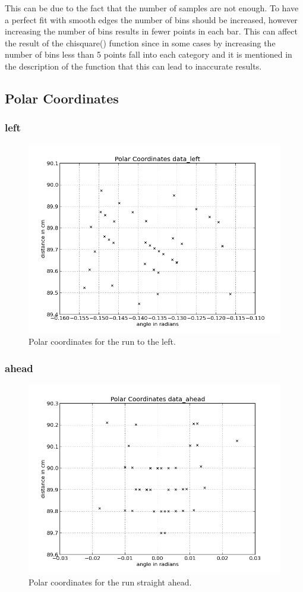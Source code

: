 \documentclass{scrartcl}
\begin{document}
This can be due to the fact that the number of samples are not enough. To have a perfect fit with smooth edges the number of bins should be increased, however increasing the number of bins results in fewer points in each bar. This can affect the result of the chisquare() function since in some cases by increasing the number of bins less than 5 points fall into each category and it is mentioned in the description of the function that this can lead to inaccurate results.

\subsection{Polar Coordinates}


\subsubsection{left}
\begin{figure}[H]
  \centering
  \includegraphics[width=0.5\linewidth]{img/data_left_pc.png}
  \caption{Polar coordinates for the run to the left.}
  \label{fig:data_left_pc}
\end{figure}

\subsubsection{ahead}
\begin{figure}[H]
  \centering
  \includegraphics[width=0.5\linewidth]{img/data_ahead_pc.png}
  \caption{Polar coordinates for the run straight ahead.}
\end{figure}
\end{document}
